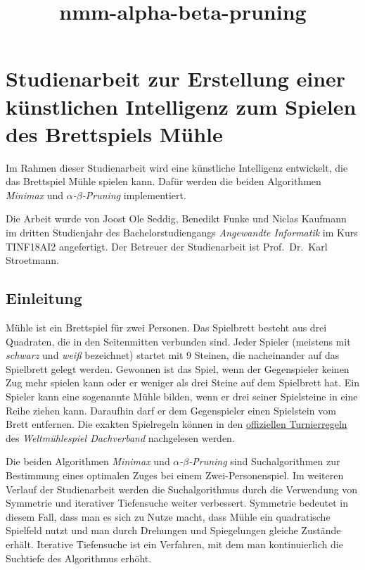\documentclass[11pt]{article}
\title{nmm-alpha-beta-pruning}
\begin{document}
    
    \maketitle
    
    

    
    \hypertarget{studienarbeit-zur-erstellung-einer-kuxfcnstlichen-intelligenz-zum-spielen-des-brettspiels-muxfchle}{%
\section{Studienarbeit zur Erstellung einer künstlichen Intelligenz zum
Spielen des Brettspiels
Mühle}\label{studienarbeit-zur-erstellung-einer-kuxfcnstlichen-intelligenz-zum-spielen-des-brettspiels-muxfchle}}

Im Rahmen dieser Studienarbeit wird eine künstliche Intelligenz
entwickelt, die das Brettspiel Mühle spielen kann. Dafür werden die
beiden Algorithmen \emph{Minimax} und \emph{$\alpha$-$\beta$-Pruning} implementiert.

Die Arbeit wurde von Joost Ole Seddig, Benedikt Funke und Niclas
Kaufmann im dritten Studienjahr des Bachelorstudiengangs
\emph{Angewandte Informatik} im Kurs TINF18AI2 angefertigt. Der Betreuer
der Studienarbeit ist Prof.~Dr.~Karl Stroetmann.

    \hypertarget{einleitung}{%
\subsection{Einleitung}\label{einleitung}}

Mühle ist ein Brettspiel für zwei Personen. Das Spielbrett besteht aus
drei Quadraten, die in den Seitenmitten verbunden sind. Jeder Spieler
(meistens mit \emph{schwarz} und \emph{weiß} bezeichnet) startet mit 9
Steinen, die nacheinander auf das Spielbrett gelegt werden. Gewonnen ist
das Spiel, wenn der Gegenspieler keinen Zug mehr spielen kann oder er
weniger als drei Steine auf dem Spielbrett hat. Ein Spieler kann eine
sogenannte Mühle bilden, wenn er drei seiner Spielsteine in eine Reihe
ziehen kann. Daraufhin darf er dem Gegenspieler einen Spielstein vom
Brett entfernen. Die exakten Spielregeln können in den
\href{http://www.muehlespiel.eu/images/pdf/WMD_Turnierreglement.pdf}{offiziellen
Turnierregeln} des \emph{Weltmühlespiel Dachverband} nachgelesen werden.

Die beiden Algorithmen \emph{Minimax} und \emph{$\alpha$-$\beta$-Pruning} sind
Suchalgorithmen zur Bestimmung eines optimalen Zuges bei einem
Zwei-Personenspiel. Im weiteren Verlauf der Studienarbeit werden die
Suchalgorithmus durch die Verwendung von Symmetrie und iterativer
Tiefensuche weiter verbessert. Symmetrie bedeutet in diesem Fall, dass
man es sich zu Nutze macht, dass Mühle ein quadratische Spielfeld nutzt
und man durch Drehungen und Spiegelungen gleiche Zustände erhält.
Iterative Tiefensuche ist ein Verfahren, mit dem man kontinuierlich die
Suchtiefe des Algorithmus erhöht.
\end{document}
